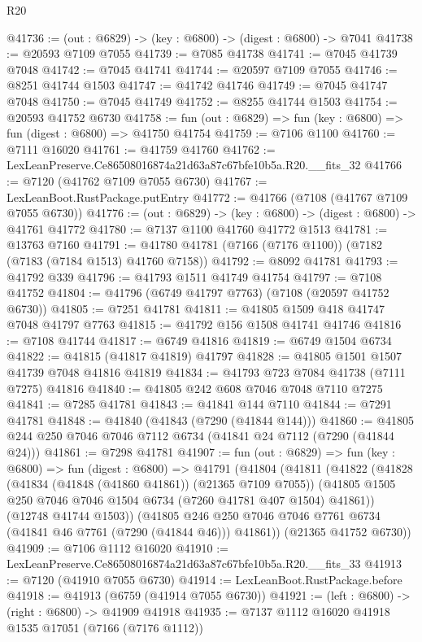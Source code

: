 \begin{lexlean}{R20}
\begin{coremodule}
{@41736 := (out : @6829) -> (key : @6800) -> (digest : @6800) -> @7041
@41738 := @20593 @7109 @7055
@41739 := @7085 @41738
@41741 := @7045 @41739 @7048
@41742 := @7045 @41741
@41744 := @20597 @7109 @7055
@41746 := @8251 @41744 @1503
@41747 := @41742 @41746
@41749 := @7045 @41747 @7048
@41750 := @7045 @41749
@41752 := @8255 @41744 @1503
@41754 := @20593 @41752 @6730
@41758 := fun (out : @6829) => fun (key : @6800) => fun (digest : @6800) => @41750 @41754
@41759 := @7106 @1100
@41760 := @7111 @16020
@41761 := @41759 @41760
@41762 := LexLeanPreserve.Ce86508016874a21d63a87c67bfe10b5a.R20.__fits_32
@41766 := @7120 (@41762 @7109 @7055 @6730)
@41767 := LexLeanBoot.RustPackage.putEntry
@41772 := @41766 (@7108 (@41767 @7109 @7055 @6730))
@41776 := (out : @6829) -> (key : @6800) -> (digest : @6800) -> @41761 @41772
@41780 := @7137 @1100 @41760 @41772 @1513
@41781 := @13763 @7160
@41791 := @41780 @41781 (@7166 (@7176 @1100)) (@7182 (@7183 (@7184 @1513) @41760 @7158))
@41792 := @8092 @41781
@41793 := @41792 @339
@41796 := @41793 @1511 @41749 @41754
@41797 := @7108 @41752
@41804 := @41796 (@6749 @41797 @7763) (@7108 (@20597 @41752 @6730))
@41805 := @7251 @41781
@41811 := @41805 @1509 @418 @41747 @7048 @41797 @7763
@41815 := @41792 @156 @1508 @41741 @41746
@41816 := @7108 @41744
@41817 := @6749 @41816
@41819 := @6749 @1504 @6734
@41822 := @41815 (@41817 @41819) @41797
@41828 := @41805 @1501 @1507 @41739 @7048 @41816 @41819
@41834 := @41793 @723 @7084 @41738 (@7111 @7275) @41816
@41840 := @41805 @242 @608 @7046 @7048 @7110 @7275
@41841 := @7285 @41781
@41843 := @41841 @144 @7110
@41844 := @7291 @41781
@41848 := @41840 (@41843 (@7290 (@41844 @144)))
@41860 := @41805 @244 @250 @7046 @7046 @7112 @6734 (@41841 @24 @7112 (@7290 (@41844 @24)))
@41861 := @7298 @41781
@41907 := fun (out : @6829) =>
  fun (key : @6800) =>
  fun (digest : @6800) =>
  @41791
    (@41804
      (@41811
        (@41822
          (@41828
            (@41834 (@41848 (@41860 @41861)) (@21365 @7109 @7055))
            (@41805 @1505 @250 @7046 @7046 @1504 @6734 (@7260 @41781 @407 @1504) @41861))
          (@12748 @41744 @1503))
        (@41805 @246 @250 @7046 @7046 @7761 @6734 (@41841 @46 @7761 (@7290 (@41844 @46))) @41861))
      (@21365 @41752 @6730))
@41909 := @7106 @1112 @16020
@41910 := LexLeanPreserve.Ce86508016874a21d63a87c67bfe10b5a.R20.__fits_33
@41913 := @7120 (@41910 @7055 @6730)
@41914 := LexLeanBoot.RustPackage.before
@41918 := @41913 (@6759 (@41914 @7055 @6730))
@41921 := (left : @6800) -> (right : @6800) -> @41909 @41918
@41935 := @7137
    @1112
    @16020
    @41918
    @1535
    @17051
    (@7166 (@7176 @1112))
}
\end{coremodule}
\end{lexlean}
